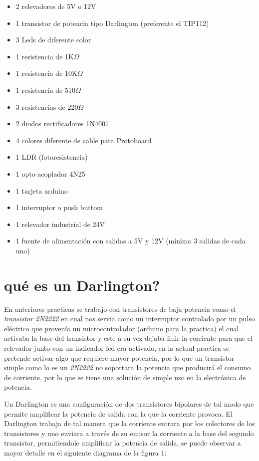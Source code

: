 \documentclass[11pt,a4paper]{article}
\begin{document}
\begin{itemize}

\item 2 relevadores de 5V o 12V
\item 1 transistor de potencia tipo Darlington (preferente el TIP112)
\item 3 Leds de diferente color
\item 1 resistencia de 1K$\Omega$
\item 1 resistencia de 10K$\Omega$
\item 1 resistencia de 510$\Omega$
\item 3 resistencias de 220$\Omega$
\item 2 diodos rectificadores 1N4007
\item 4 colores diferente de cable para Protoboard
\item 1 LDR (fotoresistencia)
\item 1 opto-acoplador 4N25
\item 1 tarjeta arduino
\item 1 interruptor o push buttom
\item 1 relevador industrial de 24V
\item 1 fuente de alimentación con salidas a 5V y 12V (mínimo 3 salidas de cada uno)

\end{itemize}


\newpage

\section{qué es un Darlington?}

En anteriores practicas se trabajo con transistores de baja potencia como el \emph{transistor 2N2222} en cual nos servia como un interruptor controlado por un pulso eléctrico que provenía un microcontrolador (arduino para la practica) el cual activaba la base del transistor y este a su vez dejaba fluir la corriente para que el relevador junto con un indicador led era activado, en la actual practica se pretende activar algo que requiere mayor potencia, por lo que un transistor simple como lo es un \emph{2N2222} no soportara la potencia que producirá el consumo de corriente, por lo que se tiene una solución de simple uso en la electrónica de potencia.

Un Darlington es una configuración de dos transistores bipolares de tal modo que permite amplificar la potencia de salida con la que la corriente provoca. El Darlington trabaja de tal manera que la corriente entrara por los colectores de los transistores y uno enviara a través de su emisor la corriente a la base del segundo transistor, permitiendole amplificar la potencia de salida, se puede observar a mayor detalle en el siguiente diagrama de la figura 1:
\end{document}
